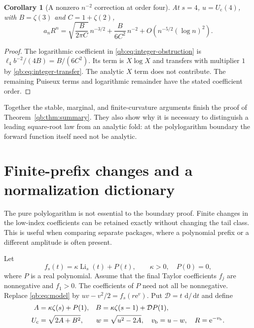 \documentclass[11pt,a4paper]{article}
\newtheorem{corollary}[theorem]{Corollary}
\theoremstyle{definition}\newtheorem{definition}[theorem]{Definition}
\theoremstyle{remark}\newtheorem{remark}[theorem]{Remark}
\newcommand{\Li}{\operatorname{Li}}
\newcommand{\ee}{\mathrm e}
\newcommand{\dd}{\,\mathrm d}
\newcommand{\Uc}{U_{\mathrm c}}
\newcommand{\vb}{v_{\mathrm b}}
\newcommand{\Dop}{\mathcal D}
\numberwithin{equation}{section}
\begin{document}
\begin{corollary}[A nonzero $n^{-2}$ correction at order four]
\label{qb:cor:four}
At $s=4$, $u=\Uc(4)$, with $B=\zeta(3)$ and $C=1+\zeta(2)$,
\begin{equation}\label{qb:eq:four-law}
 a_nR^n=\sqrt{\frac{B}{2\pi C}}\,n^{-3/2}
       +\frac{B}{6C^2}\,n^{-2}
       +O(n^{-5/2}(\log n)^2).
\end{equation}
\end{corollary}
\begin{proof}
The logarithmic coefficient in
\eqref{qb:eq:integer-obstruction} is
$\ell_4b^{-2}/(4B)=B/(6C^2)$. Its term is $X\log X$ and transfers
with multiplier $1$ by \eqref{qb:eq:integer-transfer}. The analytic
$X$ term does not contribute. The remaining Puiseux terms and logarithmic
remainder have the stated coefficient order.
\end{proof}

Together the stable, marginal, and finite-curvature arguments finish the
proof of Theorem~\ref{qb:thm:summary}. They also show why it is necessary
to distinguish a leading square-root law from an analytic fold: at the
polylogarithm boundary the forward function itself need not be analytic.

\section{Finite-prefix changes and a normalization dictionary}
\label{qb:sec:prefix}

The pure polylogarithm is not essential to the boundary proof. Finite
changes in the low-index coefficients can be retained exactly without
changing the tail class. This is useful when comparing separate packages,
where a polynomial prefix or a different amplitude is often present.

Let
\begin{equation}\label{qb:eq:prefix-model}
 f_s(t)=\kappa\Li_s(t)+P(t),\qquad \kappa>0,\quad P(0)=0,
\end{equation}
where $P$ is a real polynomial. Assume that the final Taylor coefficients
$f_j$ are nonnegative and $f_1>0$. The coefficients of $P$ need not all be
nonnegative. Replace \eqref{qb:eq:model} by
\(uv-v^2/2=f_s(r\ee^v)\). Put $\Dop=t\,\dd/\dd t$ and define
\begin{align}\label{qb:eq:prefix-constants}
 A&=\kappa\zeta(s)+P(1),&
 B&=\kappa\zeta(s-1)+\Dop P(1),\notag\\
 \Uc&=\sqrt{2A+B^2},&
 w&=\sqrt{u^2-2A},\quad \vb=u-w,\quad R=\ee^{-\vb}.
\end{align}
\end{document}
